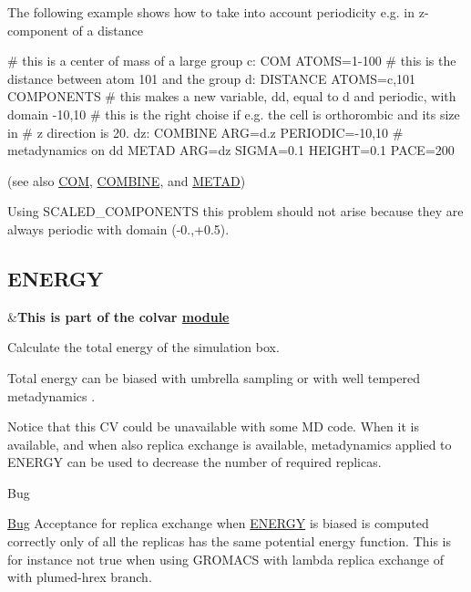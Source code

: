 The following example shows how to take into account periodicity e.\+g. in z-\/component of a distance \begin{DoxyVerb}# this is a center of mass of a large group
c: COM ATOMS=1-100
# this is the distance between atom 101 and the group
d: DISTANCE ATOMS=c,101 COMPONENTS
# this makes a new variable, dd, equal to d and periodic, with domain -10,10
# this is the right choise if e.g. the cell is orthorombic and its size in
# z direction is 20.
dz: COMBINE ARG=d.z PERIODIC=-10,10
# metadynamics on dd
METAD ARG=dz SIGMA=0.1 HEIGHT=0.1 PACE=200
\end{DoxyVerb}
 (see also \hyperlink{COM}{C\+O\+M}, \hyperlink{COMBINE}{C\+O\+M\+B\+I\+N\+E}, and \hyperlink{METAD}{M\+E\+T\+A\+D})

Using S\+C\+A\+L\+E\+D\+\_\+\+C\+O\+M\+P\+O\+N\+E\+N\+T\+S this problem should not arise because they are always periodic with domain (-\/0.,+0.5). \hypertarget{ENERGY}{}\subsection{E\+N\+E\+R\+G\+Y}\label{ENERGY}
\begin{TabularC}{2}
\hline
&{\bfseries  This is part of the colvar \hyperlink{mymodules}{module }}   \\
\end{TabularC}
Calculate the total energy of the simulation box.

Total energy can be biased with umbrella sampling \cite{bart-karp98jpcb} or with well tempered metadynamics \cite{Bonomi:2009p17935}.

Notice that this C\+V could be unavailable with some M\+D code. When it is available, and when also replica exchange is available, metadynamics applied to E\+N\+E\+R\+G\+Y can be used to decrease the number of required replicas.

\begin{DoxyRefDesc}{Bug}
\item[\hyperlink{bug__bug000001}{Bug}]Acceptance for replica exchange when \hyperlink{ENERGY}{E\+N\+E\+R\+G\+Y} is biased is computed correctly only of all the replicas has the same potential energy function. This is for instance not true when using G\+R\+O\+M\+A\+C\+S with lambda replica exchange of with plumed-\/hrex branch.\end{DoxyRefDesc}


